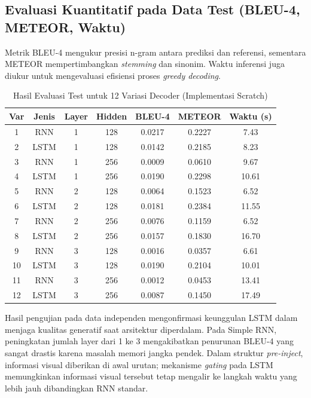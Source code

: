 \subsection{Evaluasi Kuantitatif pada Data Test (BLEU-4, METEOR, Waktu)}

Metrik BLEU-4 mengukur presisi n-gram antara prediksi dan referensi, sementara METEOR mempertimbangkan \textit{stemming} dan sinonim. Waktu inferensi juga diukur untuk mengevaluasi efisiensi proses \textit{greedy decoding}.

\begin{table}[H]
	\centering
	\caption{Hasil Evaluasi Test untuk 12 Variasi Decoder (Implementasi Scratch)}
	\begin{tabular}{ccccccc}
		\toprule
		\textbf{Var} & \textbf{Jenis} & \textbf{Layer} & \textbf{Hidden} & \textbf{BLEU-4} & \textbf{METEOR} & \textbf{Waktu (s)} \\
		\midrule
		1 & RNN & 1 & 128 & 0.0217 & 0.2227 & 7.43 \\
		2 & LSTM & 1 & 128 & 0.0142 & 0.2185 & 8.23 \\
		3 & RNN & 1 & 256 & 0.0009 & 0.0610 & 9.67 \\
		4 & LSTM & 1 & 256 & 0.0190 & 0.2298 & 10.61 \\
		5 & RNN & 2 & 128 & 0.0064 & 0.1523 & 6.52 \\
		6 & LSTM & 2 & 128 & 0.0181 & 0.2384 & 11.55 \\
		7 & RNN & 2 & 256 & 0.0076 & 0.1159 & 6.52 \\
		8 & LSTM & 2 & 256 & 0.0157 & 0.1830 & 16.70 \\
		9 & RNN & 3 & 128 & 0.0016 & 0.0357 & 6.61 \\
		10 & LSTM & 3 & 128 & 0.0190 & 0.2104 & 10.01 \\
		11 & RNN & 3 & 256 & 0.0012 & 0.0453 & 13.41 \\
		12 & LSTM & 3 & 256 & 0.0087 & 0.1450 & 17.49 \\
		\bottomrule
	\end{tabular}
	\label{tab:caption-12var-testmetrics}
\end{table}

Hasil pengujian pada data independen mengonfirmasi keunggulan LSTM dalam menjaga kualitas generatif saat arsitektur diperdalam. Pada Simple RNN, peningkatan jumlah layer dari 1 ke 3 mengakibatkan penurunan BLEU-4 yang sangat drastis karena masalah memori jangka pendek. Dalam struktur \textit{pre-inject}, informasi visual diberikan di awal urutan; mekanisme \textit{gating} pada LSTM memungkinkan informasi visual tersebut tetap mengalir ke langkah waktu yang lebih jauh dibandingkan RNN standar.

